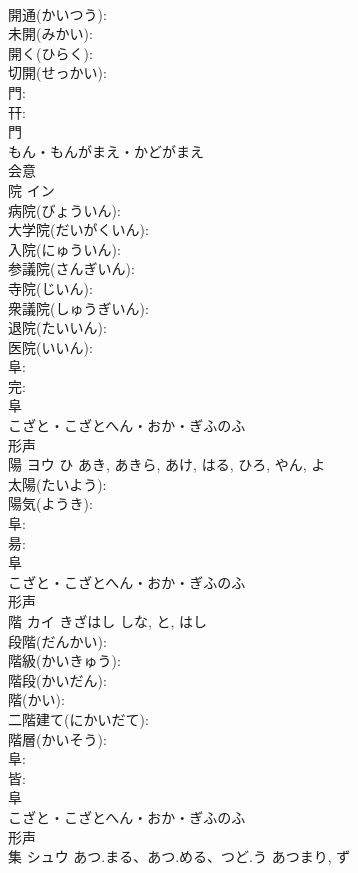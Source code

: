 \documentclass[8pt]{extreport}
\begin{document}
\begin{CJK}{UTF8}{min}
\\	開通(かいつう): 
\\	未開(みかい): 
\\	開く(ひらく): 
\\	切開(せっかい): 
\\	門: 
\\	幵: 
\\	門	
\\	もん・もんがまえ・かどがまえ	
\\	会意 
\\	院	イン			
\\	病院(びょういん): 
\\	大学院(だいがくいん): 
\\	入院(にゅういん): 
\\	参議院(さんぎいん): 
\\	寺院(じいん): 
\\	衆議院(しゅうぎいん): 
\\	退院(たいいん): 
\\	医院(いいん): 
\\	阜: 
\\	完: 
\\	阜	
\\	こざと・こざとへん・おか・ぎふのふ	
\\	形声 
\\	陽	ヨウ	ひ	あき, あきら, あけ, はる, ひろ, やん, よ	
\\	太陽(たいよう): 
\\	陽気(ようき): 
\\	阜: 
\\	昜: 
\\	阜	
\\	こざと・こざとへん・おか・ぎふのふ	
\\	形声 
\\	階	カイ	きざはし	しな, と, はし	
\\	段階(だんかい): 
\\	階級(かいきゅう): 
\\	階段(かいだん): 
\\	階(かい): 
\\	二階建て(にかいだて): 
\\	階層(かいそう): 
\\	阜: 
\\	皆: 
\\	阜	
\\	こざと・こざとへん・おか・ぎふのふ	
\\	形声 
\\	集	シュウ	あつ.まる、あつ.める、つど.う	あつまり, ず	

\end{CJK}
\end{document}
